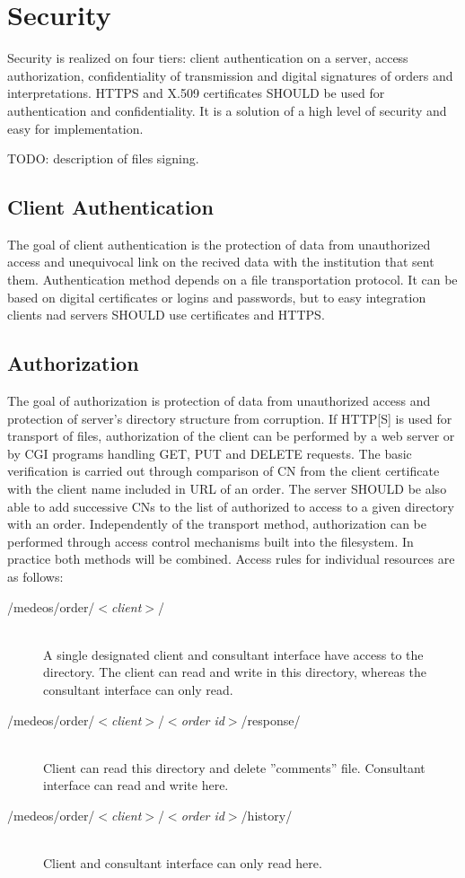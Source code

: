 \documentclass[a4paper]{article}
\begin{document}
\section{Security}
\label{sec:bezp}

Security is realized on four tiers: client authentication on a server, access authorization, 
confidentiality of transmission and digital signatures of orders and interpretations. 
HTTPS and X.509 certificates SHOULD be used for authentication and confidentiality. It is a 
solution of a high level of security and easy for implementation.

TODO: description of files signing.

\subsection{Client Authentication} 

The goal of client authentication is the protection of data from unauthorized access and
unequivocal link on the recived data with the institution that sent them.
Authentication method depends on a file transportation
protocol. It can be based on digital certificates or logins and passwords, but to easy
integration clients nad servers SHOULD use certificates and HTTPS.

\subsection{Authorization}

The goal of authorization is protection of data from unauthorized access and protection
of server's directory structure from corruption. If HTTP[S] is used for transport of files, 
authorization of the client can be performed by a web server or by CGI programs handling GET, 
PUT and DELETE requests. The basic verification is carried out through comparison of CN from 
the client certificate with the client name included in URL of an order. The server SHOULD 
be also able to add successive CNs to the list of authorized to access to a given directory 
with an order. Independently of the transport method, authorization can be performed through 
access control mechanisms built into the filesystem. In practice both methods will be combined. 
Access rules for individual resources are as follows:
\begin{description}
  \item[/medeos/order/$<$\textit{client}$>$/]\hfill\\
  A single designated client and consultant interface have access to the directory. The 
  client can read and write in this directory, whereas the consultant interface can only read.
  \item[/medeos/order/$<$\textit{client}$>$/$<$\textit{order id}$>$/response/]\hfill\\ 
  Client can read this directory and delete ''comments'' file. Consultant interface can
  read and write here.
  \item[/medeos/order/$<$\textit{client}$>$/$<$\textit{order id}$>$/history/]\hfill\\ 
  Client and consultant interface can only read here. 
\end{description}
\end{document}
